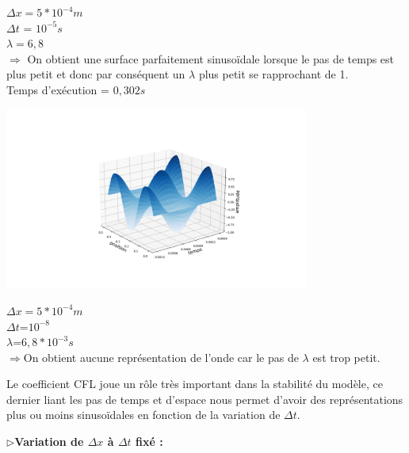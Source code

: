\begin{enumerate}[label=\alph*)]
\begin{minipage}{.5\textwidth}%
\item $\Delta x = 5*{10}^{-4}m$\\
$\Delta t$ = ${10}^{-5} s $ \\
$\lambda =6,8$\\

$\Longrightarrow$ On obtient une surface parfaitement  sinusoïdale lorsque le pas de temps est plus petit et donc par conséquent un $\lambda$ plus petit se rapprochant de 1.\\ 
Temps d'exécution = $0,302s$
\end{minipage}%
\hfill
\begin{minipage}{.45\textwidth}%
\includegraphics[width=10cm,height=6cm]{implicited.png}
\end{minipage}%




\begin{minipage}{.8\textwidth}%

\item $\Delta x=5*{10}^{-4}m$\\
$\Delta t$=${10}^{-8}$\\
$\lambda$=$6,8*{10}^{-3}s$\\


$\Longrightarrow$On obtient aucune représentation de l'onde car le pas de $\lambda$ est trop petit.\\

\end{minipage}%
\newline
\newline
Le coefficient CFL joue un rôle très important dans la stabilité du modèle, ce dernier liant les pas de temps et d'espace nous permet d'avoir des représentations plus ou moins sinusoïdales en fonction de la variation de $\Delta t$.
\end{enumerate}

$\triangleright$\textbf{Variation de  $\Delta x$ à $\Delta t$ fixé :}\\

